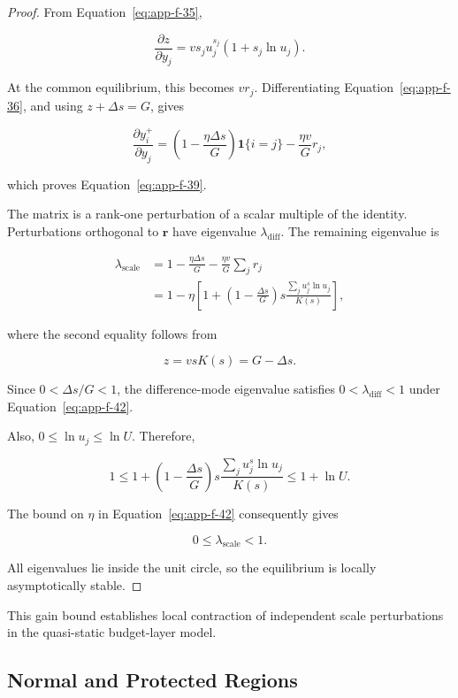 \begin{proof} From Equation~\eqref{eq:app-f-35},

\begin{equation}
\label{eq:app-f-43}
\frac{\partial z}{\partial y_j}
=
v s_ju_j^{s_j}(1+s_j\ln u_j).
\end{equation}

At the common equilibrium, this becomes \(vr_j\). Differentiating Equation~\eqref{eq:app-f-36}, and using \(z+\Delta s=G\), gives

\[
\frac{\partial y_i^+}{\partial y_j}
=
\left(1-\frac{\eta\Delta s}{G}\right)\mathbf 1\{i=j\}
-\frac{\eta v}{G}r_j,
\]

which proves Equation~\eqref{eq:app-f-39}.

The matrix is a rank-one perturbation of a scalar multiple of the identity. Perturbations orthogonal to \(\mathbf r\) have eigenvalue \(\lambda_{\mathrm{diff}}\). The remaining eigenvalue is

\[
\begin{aligned}
\lambda_{\mathrm{scale}}
&=
1-\frac{\eta\Delta s}{G}
-\frac{\eta v}{G}\sum_jr_j\\
&=
1-\eta
\left[
1+
\left(1-\frac{\Delta s}{G}\right)
s\frac{\sum_j u_j^s\ln u_j}{K(s)}
\right],
\end{aligned}
\]

where the second equality follows from

\[
z=v s K(s)=G-\Delta s.
\]

Since \(0<\Delta s/G<1\), the difference-mode eigenvalue satisfies \(0<\lambda_{\mathrm{diff}}<1\) under Equation~\eqref{eq:app-f-42}.

Also, \(0\le\ln u_j\le\ln U\). Therefore,

\[
1\le
1+
\left(1-\frac{\Delta s}{G}\right)
s\frac{\sum_j u_j^s\ln u_j}{K(s)}
\le1+\ln U.
\]

The bound on \(\eta\) in Equation~\eqref{eq:app-f-42} consequently gives

\[
0\le\lambda_{\mathrm{scale}}<1.
\]

All eigenvalues lie inside the unit circle, so the equilibrium is locally asymptotically stable.
\end{proof}

This gain bound establishes local contraction of independent scale perturbations in the quasi-static budget-layer model.

\subsection{Normal and Protected Regions}
\label{app:f-6}

